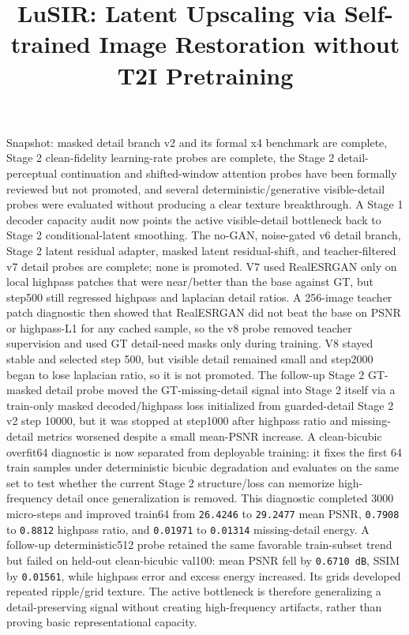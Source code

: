\documentclass[
  10pt,
]{article}
\title{LuSIR: Latent Upscaling via Self-trained Image Restoration
without T2I Pretraining}
\author{}
\date{}
\begin{document}
\maketitle

{
\hypersetup{linkcolor=}
\setcounter{tocdepth}{3}
\tableofcontents
}
Snapshot: masked detail branch v2 and its formal x4 benchmark are
complete, Stage 2 clean-fidelity learning-rate probes are complete, the
Stage 2 detail-perceptual continuation and shifted-window attention
probes have been formally reviewed but not promoted, and several
deterministic/generative visible-detail probes were evaluated without
producing a clear texture breakthrough. A Stage 1 decoder capacity audit
now points the active visible-detail bottleneck back to Stage 2
conditional-latent smoothing. The no-GAN, noise-gated v6 detail branch,
Stage 2 latent residual adapter, masked latent residual-shift, and
teacher-filtered v7 detail probes are complete; none is promoted. V7
used RealESRGAN only on local highpass patches that were near/better
than the base against GT, but step500 still regressed highpass and
laplacian detail ratios. A 256-image teacher patch diagnostic then
showed that RealESRGAN did not beat the base on PSNR or highpass-L1 for
any cached sample, so the v8 probe removed teacher supervision and used
GT detail-need masks only during training. V8 stayed stable and selected
step 500, but visible detail remained small and step2000 began to lose
laplacian ratio, so it is not promoted. The follow-up Stage 2 GT-masked
detail probe moved the GT-missing-detail signal into Stage 2 itself via
a train-only masked decoded/highpass loss initialized from
guarded-detail Stage 2 v2 step 10000, but it was stopped at step1000
after highpass ratio and missing-detail metrics worsened despite a small
mean-PSNR increase. A clean-bicubic overfit64 diagnostic is now
separated from deployable training: it fixes the first 64 train samples
under deterministic bicubic degradation and evaluates on the same set to
test whether the current Stage 2 structure/loss can memorize
high-frequency detail once generalization is removed. This diagnostic
completed 3000 micro-steps and improved train64 from \texttt{26.4246} to
\texttt{29.2477} mean PSNR, \texttt{0.7908} to \texttt{0.8812} highpass
ratio, and \texttt{0.01971} to \texttt{0.01314} missing-detail energy. A
follow-up deterministic512 probe retained the same favorable
train-subset trend but failed on held-out clean-bicubic val100: mean
PSNR fell by \texttt{0.6710\ dB}, SSIM by \texttt{0.01561}, while
highpass error and excess energy increased. Its grids developed repeated
ripple/grid texture. The active bottleneck is therefore generalizing a
detail-preserving signal without creating high-frequency artifacts,
rather than proving basic representational capacity.
\end{document}
